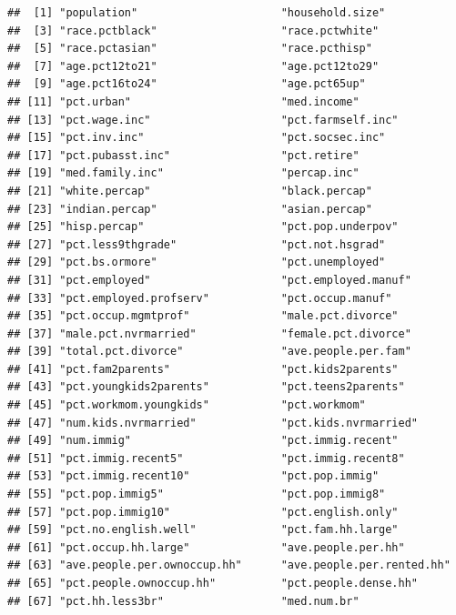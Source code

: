\documentclass[]{article}
\begin{document}
\begin{verbatim}
##  [1] "population"                      "household.size"                 
##  [3] "race.pctblack"                   "race.pctwhite"                  
##  [5] "race.pctasian"                   "race.pcthisp"                   
##  [7] "age.pct12to21"                   "age.pct12to29"                  
##  [9] "age.pct16to24"                   "age.pct65up"                    
## [11] "pct.urban"                       "med.income"                     
## [13] "pct.wage.inc"                    "pct.farmself.inc"               
## [15] "pct.inv.inc"                     "pct.socsec.inc"                 
## [17] "pct.pubasst.inc"                 "pct.retire"                     
## [19] "med.family.inc"                  "percap.inc"                     
## [21] "white.percap"                    "black.percap"                   
## [23] "indian.percap"                   "asian.percap"                   
## [25] "hisp.percap"                     "pct.pop.underpov"               
## [27] "pct.less9thgrade"                "pct.not.hsgrad"                 
## [29] "pct.bs.ormore"                   "pct.unemployed"                 
## [31] "pct.employed"                    "pct.employed.manuf"             
## [33] "pct.employed.profserv"           "pct.occup.manuf"                
## [35] "pct.occup.mgmtprof"              "male.pct.divorce"               
## [37] "male.pct.nvrmarried"             "female.pct.divorce"             
## [39] "total.pct.divorce"               "ave.people.per.fam"             
## [41] "pct.fam2parents"                 "pct.kids2parents"               
## [43] "pct.youngkids2parents"           "pct.teens2parents"              
## [45] "pct.workmom.youngkids"           "pct.workmom"                    
## [47] "num.kids.nvrmarried"             "pct.kids.nvrmarried"            
## [49] "num.immig"                       "pct.immig.recent"               
## [51] "pct.immig.recent5"               "pct.immig.recent8"              
## [53] "pct.immig.recent10"              "pct.pop.immig"                  
## [55] "pct.pop.immig5"                  "pct.pop.immig8"                 
## [57] "pct.pop.immig10"                 "pct.english.only"               
## [59] "pct.no.english.well"             "pct.fam.hh.large"               
## [61] "pct.occup.hh.large"              "ave.people.per.hh"              
## [63] "ave.people.per.ownoccup.hh"      "ave.people.per.rented.hh"       
## [65] "pct.people.ownoccup.hh"          "pct.people.dense.hh"            
## [67] "pct.hh.less3br"                  "med.num.br"                     

\end{verbatim}
\end{document}
